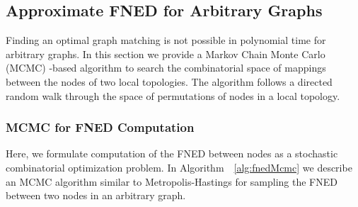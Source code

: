 \documentclass{article}
\begin{document}


\subsection{Approximate FNED for Arbitrary Graphs}

Finding an optimal graph matching is not possible in polynomial time for arbitrary graphs. In this section we provide a Markov Chain Monte Carlo (MCMC) -based algorithm to search the combinatorial space of mappings between the nodes of two local topologies. The algorithm follows a directed random walk through the space of permutations of nodes in a local topology.


\subsubsection{MCMC for FNED Computation}
Here, we formulate computation of the FNED between nodes as a stochastic combinatorial optimization problem. In Algorithm~~\ref{alg:fnedMcmc} we describe an MCMC algorithm similar to Metropolis-Hastings for sampling the FNED between two nodes in an arbitrary graph.
\end{document}
